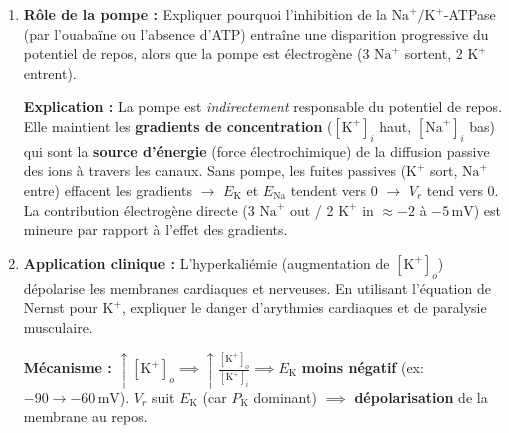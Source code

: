 \documentclass[11pt]{article}
\begin{document}
\begin{exercice}
\begin{enumerate}
\par \textbf{Calculs Nernst ($20^\circ\text{C}$) :}
$E_{\text{K}} = 58 \log_{10}(20/400) = 58 \log_{10}(0,05) \approx \mathbf{-75,5\,mV}$.
$E_{\text{Na}} = 58 \log_{10}(440/50) = 58 \log_{10}(8,8) \approx \mathbf{+54,8\,mV}$.
$E_{\text{Cl}} = 58 \log_{10}(40/560) \approx \mathbf{-66,5\,mV}$.
\par \textbf{Comparaison :} $V_r (-70\,\text{mV})$ est très proche de $E_{\text{K}}$ et $E_{\text{Cl}}$, très loin de $E_{\text{Na}}$.
\par \textbf{Démonstration GHK :} Si $P_{\text{Na}}$ était comparable à $P_{\text{K}}$, le terme $P_{\text{Na}}[\text{Na}^+]_o$ (numérateur) serait énorme ($P_{\text{Na}} \times 440$) et tirerait $V_m$ vers des valeurs positives. Pour que $V_m \approx -70\,\text{mV}$, il faut que le numérateur soit dominé par $P_{\text{K}}[\text{K}^+]_o$ et le dénominateur par $P_{\text{K}}[\text{K}^+]_i$. Donc \textbf{$P_{\text{K}} \gg P_{\text{Na}}$} (typiquement $P_{\text{K}} / P_{\text{Na}} \approx 20 \text{ à } 100$ au repos).
\item \textbf{Rôle de la pompe :} Expliquer pourquoi l'inhibition de la $\text{Na}^+/\text{K}^+$-ATPase (par l'ouabaïne ou l'absence d'ATP) entraîne une disparition progressive du potentiel de repos, alors que la pompe est électrogène (3 $\text{Na}^+$ sortent, 2 $\text{K}^+$ entrent).
\par \textbf{Explication :} La pompe est \emph{indirectement} responsable du potentiel de repos. Elle maintient les \textbf{gradients de concentration} ($[\text{K}^+]_i$ haut, $[\text{Na}^+]_i$ bas) qui sont la \textbf{source d'énergie} (force électrochimique) de la diffusion passive des ions à travers les canaux. Sans pompe, les fuites passives ($\text{K}^+$ sort, $\text{Na}^+$ entre) effacent les gradients $\to$ $E_{\text{K}}$ et $E_{\text{Na}}$ tendent vers 0 $\to$ $V_r$ tend vers 0. La contribution électrogène directe (3 $\text{Na}^+$ out / 2 $\text{K}^+$ in $\approx -2$ à $-5\,\text{mV}$) est mineure par rapport à l'effet des gradients.
\item \textbf{Application clinique :} L'hyperkaliémie (augmentation de $[\text{K}^+]_o$) dépolarise les membranes cardiaques et nerveuses. En utilisant l'équation de Nernst pour $\text{K}^+$, expliquer le danger d'arythmies cardiaques et de paralysie musculaire.
\par \textbf{Mécanisme :} $\uparrow [\text{K}^+]_o \implies \uparrow \frac{[\text{K}^+]_o}{[\text{K}^+]_i} \implies E_{\text{K}}$ \textbf{moins négatif} (ex: $-90 \to -60\,\text{mV}$). $V_r$ suit $E_{\text{K}}$ (car $P_{\text{K}}$ dominant) $\implies$ \textbf{dépolarisation} de la membrane au repos.

\end{enumerate}
\end{exercice}
\end{document}
